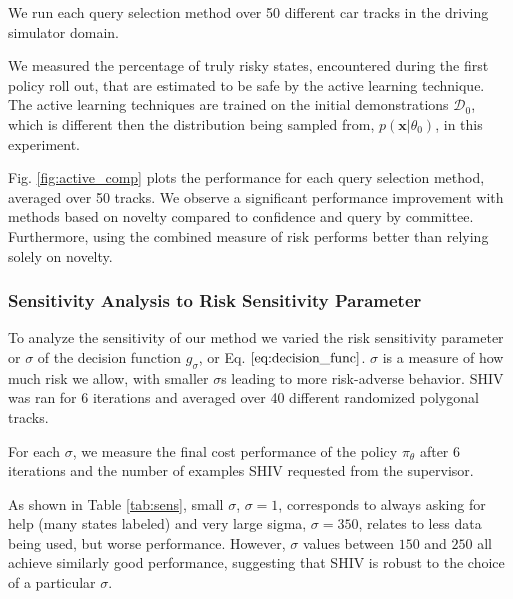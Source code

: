 \documentclass[10pt, conference]{ieeeconf}      %
\newcommand{\bx}{\mathbf{x}}
\begin{document}
We run each query selection method over 50 different car tracks in the driving simulator domain.

We measured the percentage of truly risky states, encountered during the first policy roll out, that  are estimated to be safe by the active learning technique. The active learning techniques are trained on the initial demonstrations $\mathcal{D}_0$, which is different then the distribution being sampled from, $p(\bx|\theta_0)$, in this experiment.

 Fig. \ref{fig:active_comp}  plots the performance for each query selection method, averaged over 50 tracks. We observe a significant performance improvement with methods based on novelty compared to confidence and query by committee. Furthermore, using the combined measure of risk performs better than relying solely on novelty. 

\subsubsection{Sensitivity Analysis to Risk Sensitivity Parameter}

 To analyze the sensitivity of our method we varied the risk sensitivity  parameter or $\sigma$ of the decision function $g_{\sigma}$, or Eq. $\ref{eq:decision_func}$. $\sigma$ is a measure of how much risk we allow, with smaller $\sigma$s leading to more risk-adverse behavior. SHIV was ran for 6 iterations and averaged over 40 different randomized polygonal tracks. 

 For each  $\sigma$, we measure the final cost performance of the policy $\pi_{\theta}$ after 6 iterations and the number of examples SHIV requested from the supervisor. 

 As shown in Table \ref{tab:sens}, small $\sigma$, $\sigma = 1$, corresponds to always asking for help (many states labeled) and very large sigma, $\sigma = 350$, relates to  less data being used, but worse performance. However, $\sigma$ values between $150$ and $250$ all achieve similarly good performance, suggesting that SHIV is robust to the choice of a particular $\sigma$.
\end{document}
